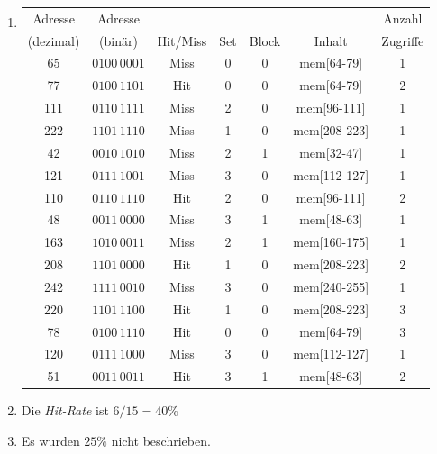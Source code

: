 \documentclass[a4paper, 12pt, margins=2cm]{homework}
\begin{document}
\begin{solution}
\begin{enumerate}[label=(\alph*)]
    \item \hfill\begin{center}
            \begin{tabular}{|c|c|c|c|c|c|c|}
              \hline
              Adresse   & Adresse      &          &     &       &                  & Anzahl   \\
              (dezimal) & (binär)      & Hit/Miss & Set & Block & Inhalt           & Zugriffe \\ \hline\hline
              65        & $0100\,0001$ & Miss     & 0   & 0     & mem{[}64-79{]}   & 1        \\
              77        & $0100\,1101$ & Hit      & 0   & 0     & mem{[}64-79{]}   & 2        \\
              111       & $0110\,1111$ & Miss     & 2   & 0     & mem{[}96-111{]}  & 1        \\
              222       & $1101\,1110$ & Miss     & 1   & 0     & mem{[}208-223{]} & 1        \\
              42        & $0010\,1010$ & Miss     & 2   & 1     & mem{[}32-47{]}   & 1        \\ \hline
              121       & $0111\,1001$ & Miss     & 3   & 0     & mem{[}112-127{]} & 1        \\
              110       & $0110\,1110$ & Hit      & 2   & 0     & mem{[}96-111{]}  & 2        \\
              48        & $0011\,0000$ & Miss     & 3   & 1     & mem{[}48-63{]}   & 1        \\
              163       & $1010\,0011$ & Miss     & 2   & 1     & mem{[}160-175{]} & 1        \\
              208       & $1101\,0000$ & Hit      & 1   & 0     & mem{[}208-223{]} & 2        \\ \hline
              242       & $1111\,0010$ & Miss     & 3   & 0     & mem{[}240-255{]} & 1        \\
              220       & $1101\,1100$ & Hit      & 1   & 0     & mem{[}208-223{]} & 3        \\
              78        & $0100\,1110$ & Hit      & 0   & 0     & mem{[}64-79{]}   & 3        \\
              120       & $0111\,1000$ & Miss     & 3   & 0     & mem{[}112-127{]} & 1        \\
              51        & $0011\,0011$ & Hit      & 3   & 1     & mem{[}48-63{]}   & 2        \\ \hline
            \end{tabular}
    \end{center}

    \item Die \emph{Hit-Rate} ist $6/15 = 40\%$

    \item Es wurden $25\%$ nicht beschrieben.
  \end{enumerate}
\end{solution}
\end{document}
